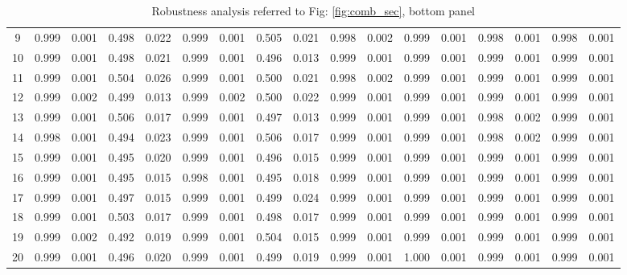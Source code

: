 \documentclass{article}
\begin{document}
\begin{table}[H]
{\begin{tabular}{|c|c|c|c|c|c|c|c|c|c|c|c|c|c|c|c|c|}
     9 & 0.999 & 0.001 & 0.498 & 0.022 & 0.999 & 0.001 & 0.505 & 0.021 & 0.998 & 0.002 & 0.999 & 0.001 & 0.998 & 0.001 & 0.998 & 0.001 \\ 
    10 & 0.999 & 0.001 & 0.498 & 0.021 & 0.999 & 0.001 & 0.496 & 0.013 & 0.999 & 0.001 & 0.999 & 0.001 & 0.999 & 0.001 & 0.999 & 0.001 \\ 
    11 & 0.999 & 0.001 & 0.504 & 0.026 & 0.999 & 0.001 & 0.500 & 0.021 & 0.998 & 0.002 & 0.999 & 0.001 & 0.999 & 0.001 & 0.999 & 0.001 \\ 
    12 & 0.999 & 0.002 & 0.499 & 0.013 & 0.999 & 0.002 & 0.500 & 0.022 & 0.999 & 0.001 & 0.999 & 0.001 & 0.999 & 0.001 & 0.999 & 0.001 \\ 
    13 & 0.999 & 0.001 & 0.506 & 0.017 & 0.999 & 0.001 & 0.497 & 0.013 & 0.999 & 0.001 & 0.999 & 0.001 & 0.998 & 0.002 & 0.999 & 0.001 \\ 
    14 & 0.998 & 0.001 & 0.494 & 0.023 & 0.999 & 0.001 & 0.506 & 0.017 & 0.999 & 0.001 & 0.999 & 0.001 & 0.998 & 0.002 & 0.999 & 0.001 \\ 
    15 & 0.999 & 0.001 & 0.495 & 0.020 & 0.999 & 0.001 & 0.496 & 0.015 & 0.999 & 0.001 & 0.999 & 0.001 & 0.999 & 0.001 & 0.999 & 0.001 \\ 
    16 & 0.999 & 0.001 & 0.495 & 0.015 & 0.998 & 0.001 & 0.495 & 0.018 & 0.999 & 0.001 & 0.999 & 0.001 & 0.999 & 0.001 & 0.999 & 0.001 \\ 
    17 & 0.999 & 0.001 & 0.497 & 0.015 & 0.999 & 0.001 & 0.499 & 0.024 & 0.999 & 0.001 & 0.999 & 0.001 & 0.999 & 0.001 & 0.999 & 0.001 \\ 
    18 & 0.999 & 0.001 & 0.503 & 0.017 & 0.999 & 0.001 & 0.498 & 0.017 & 0.999 & 0.001 & 0.999 & 0.001 & 0.999 & 0.001 & 0.999 & 0.001 \\ 
    19 & 0.999 & 0.002 & 0.492 & 0.019 & 0.999 & 0.001 & 0.504 & 0.015 & 0.999 & 0.001 & 0.999 & 0.001 & 0.999 & 0.001 & 0.999 & 0.001 \\ 
    20 & 0.999 & 0.001 & 0.496 & 0.020 & 0.999 & 0.001 & 0.499 & 0.019 & 0.999 & 0.001 & 1.000 & 0.001 & 0.999 & 0.001 & 0.999 & 0.001 \\ 
   \hline
\end{tabular}
}

\caption{Robustness analysis referred to Fig: \ref{fig:comb_sec}, bottom panel}
\label{tab:comb_sec}
\end{table}
\end{document}
